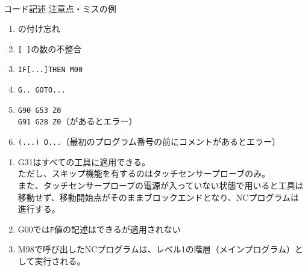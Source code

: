 \begin{appendices}
\Appendixpart


\clearpage
~\vfill
\begin{\Columnname}{コード記述 注意点・ミスの例}
\begin{enumerate}
\item \ttNum\hx の付け忘れ
\item \verb|[ ]|の数の不整合
\item \verb|IF[...]THEN M00|
\item \verb|G.. GOTO...|
\item \verb|G90 G53 Z0|\\
      \verb|G91 G28 Z0|（\TLCorrection があるとエラー）
\item \verb|(...) O...|（最初のプログラム番号の前にコメントがあるとエラー）
\end{enumerate}
\tcbline*
\begin{enumerate}
\item
{\ttfamily G31}はすべての工具に適用できる。\\
ただし、スキップ機能を有するのはタッチセンサープローブのみ。\\
また、タッチセンサープローブの電源が入っていない状態で用いると工具は移動せず、移動開始点がそのままブロックエンドとなり、NCプログラムは進行する。
\item {\ttfamily G00}では\verb|F|値の記述はできるが適用されない
\item {\ttfamily M98}で呼び出したNCプログラムは、レベル1の階層（メインプログラム）として実行される。
\end{enumerate}
\end{\Columnname}
\end{appendices}

